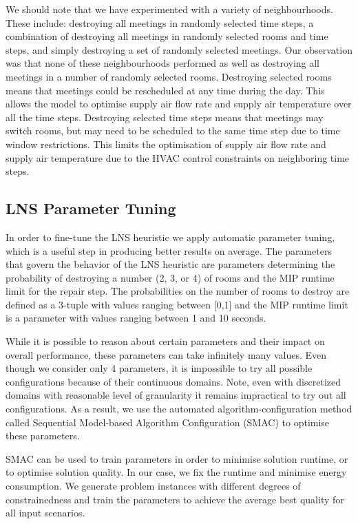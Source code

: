 We should note that we have experimented with a variety of neighbourhoods. These include: destroying all meetings in randomly selected time steps, a combination of destroying all meetings in randomly selected rooms and time steps, and simply destroying a set of randomly selected meetings. Our observation was that none of these neighbourhoods performed as well as destroying all meetings in a number of randomly selected rooms. Destroying selected rooms means that meetings could be rescheduled at any time during the day. This allows the model to optimise supply air flow rate and supply air temperature over all the time steps. Destroying selected time steps means that meetings may switch rooms, but may need to be scheduled to the same time step due to time window restrictions. This limits the optimisation of supply air flow rate and supply air temperature due to the HVAC control constraints on neighboring time steps.



\subsection{LNS Parameter Tuning}\label{sec:lns_param}

In order to fine-tune the LNS heuristic we apply automatic parameter tuning, which is a useful step in producing better results on average.
The parameters that govern the behavior of the LNS heuristic are parameters determining the probability of destroying a number (2, 3, or 4) of rooms and the MIP runtime limit for the repair step. The probabilities on the number of rooms to destroy are defined as a 3-tuple with values ranging between [0,1] and the MIP runtime limit is a parameter with values ranging between 1 and 10 seconds. 

While it is possible to reason about certain parameters and their impact on overall performance, these parameters can take infinitely many values. Even though we consider only 4 parameters, it is impossible to try all possible configurations because of their continuous domains. Note, even with discretized domains with reasonable level of granularity it remains impractical to try out all configurations. As a result, we use the automated algorithm-configuration method called Sequential Model-based Algorithm Configuration (SMAC) \citep{hutter2011sequential} to optimise these parameters.

SMAC can be used to train parameters in order to minimise solution runtime, or to optimise solution quality. In our case, we fix the runtime and minimise energy consumption. We generate problem instances with different degrees of constrainedness and train the parameters to achieve the average best quality for all input scenarios.

